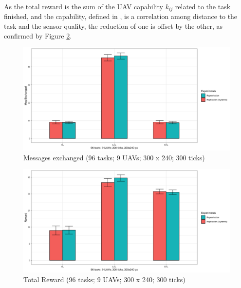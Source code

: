 As the total reward is the sum of the UAV capability $k_{ij}$ related to the task finished, and the capability, defined in \cite{MAS07}, is a correlation among distance to the task and the sensor quality, the reduction of one is offset by the other, as confirmed by Figure \ref{fig:fig02}.

\begin{figure}[h!]
	\begin{center}
		\includegraphics[scale=0.15]{fig/msg_orig.png}
		\caption{Messages exchanged (96 tasks; 9 UAVs; 300 x 240; 300 ticks)}
		\label{fig:fig01}
	\end{center}
\end{figure}

\begin{figure}[h!]
	\begin{center}
		\includegraphics[scale=0.15]{fig/reward_orig.png}
		\caption{Total Reward (96 tasks; 9 UAVs; 300 x 240; 300 ticks)}
		\label{fig:fig02}
	\end{center}
\end{figure}

